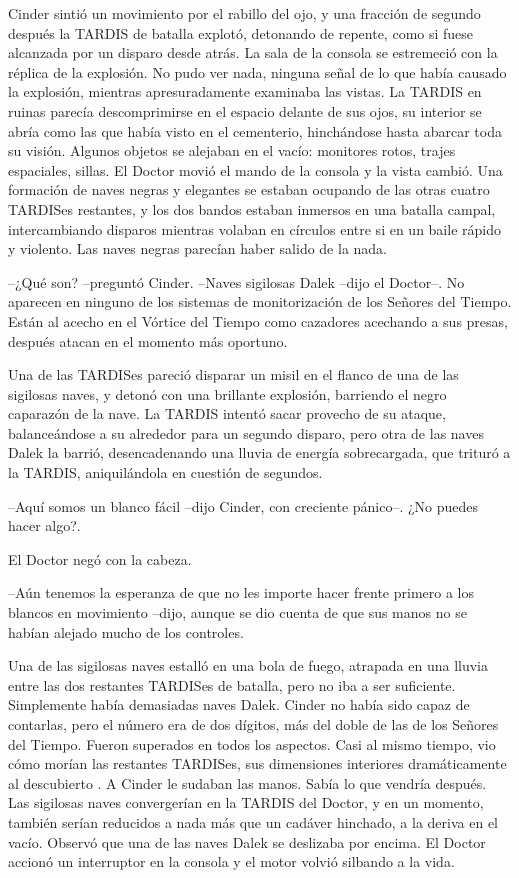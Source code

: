 Cinder sintió un movimiento por el rabillo del ojo, y una fracción de segundo después la TARDIS de batalla explotó, detonando de repente, como si fuese alcanzada por un disparo desde atrás. La sala de la consola se estremeció con la réplica de la explosión. No pudo ver nada, ninguna señal de lo que había causado la explosión, mientras apresuradamente examinaba las vistas.
La TARDIS en ruinas parecía descomprimirse en el espacio delante de sus ojos, su interior se abría como las que había visto en el cementerio, hinchándose hasta abarcar toda su visión. Algunos objetos se alejaban en el vacío: monitores rotos, trajes espaciales, sillas.
El Doctor movió el mando de la consola y la vista cambió. Una formación de naves negras y elegantes se estaban ocupando de las otras cuatro TARDISes restantes, y los dos bandos estaban inmersos en una batalla campal, intercambiando disparos mientras volaban en círculos entre si en un baile rápido y violento.
Las naves negras parecían haber salido de la nada. 

--¿Qué son? --preguntó Cinder.
--Naves sigilosas Dalek --dijo el Doctor--. No aparecen en ninguno de los sistemas de monitorización de los Señores del Tiempo. Están al acecho en el Vórtice del Tiempo como cazadores acechando a sus presas, después atacan en el momento más oportuno.

Una de las TARDISes pareció disparar un misil en el flanco de una de las sigilosas naves, y detonó con una brillante explosión, barriendo el negro caparazón de la nave. La TARDIS intentó sacar provecho de su ataque, balanceándose a su alrededor para un segundo disparo, pero otra de las naves Dalek la barrió, desencadenando una lluvia de energía sobrecargada, que trituró a la TARDIS, aniquilándola en cuestión de segundos.

--Aquí somos un blanco fácil --dijo Cinder, con creciente pánico--. ¿No puedes hacer algo?.

El Doctor negó con la cabeza. 

--Aún tenemos la esperanza de que no les importe hacer frente primero a los blancos en movimiento --dijo, aunque se dio cuenta de que sus manos no se habían alejado mucho de los controles.

Una de las sigilosas naves estalló en una bola de fuego, atrapada en una lluvia entre las dos restantes TARDISes de batalla, pero no iba a ser suficiente. Simplemente había demasiadas naves Dalek. Cinder no había sido capaz de contarlas, pero el número era de dos dígitos, más del doble de las de los Señores del Tiempo. Fueron superados en todos los aspectos.
Casi al mismo tiempo, vio cómo morían las restantes TARDISes, sus dimensiones interiores dramáticamente al descubierto .
A Cinder le sudaban las manos. Sabía lo que vendría después. Las sigilosas naves convergerían en la TARDIS del Doctor, y en un momento, también serían reducidos a nada más que un cadáver hinchado, a la deriva en el vacío.
Observó que una de las naves Dalek se deslizaba por encima. El Doctor accionó un interruptor en la consola y el motor volvió silbando a la vida.

